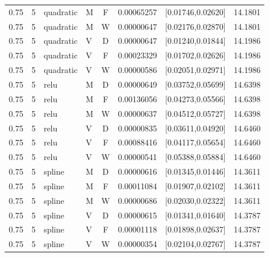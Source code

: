 \begin{longtable}{rrllcrrr}
0.75 & 5 & quadratic & M & F & 0.00065257 & [0.01746,0.02620] & 14.1801 \\

0.75 & 5 & quadratic & M & W & 0.00000647 & [0.02176,0.02870] & 14.1801 \\

0.75 & 5 & quadratic & V & D & 0.00000647 & [0.01240,0.01844] & 14.1986 \\

0.75 & 5 & quadratic & V & F & 0.00023329 & [0.01702,0.02626] & 14.1986 \\

0.75 & 5 & quadratic & V & W & 0.00000586 & [0.02051,0.02971] & 14.1986 \\

0.75 & 5 & relu & M & D & 0.00000649 & [0.03752,0.05699] & 14.6398 \\

0.75 & 5 & relu & M & F & 0.00136056 & [0.04273,0.05566] & 14.6398 \\

0.75 & 5 & relu & M & W & 0.00000637 & [0.04512,0.05727] & 14.6398 \\

0.75 & 5 & relu & V & D & 0.00000835 & [0.03611,0.04920] & 14.6460 \\

0.75 & 5 & relu & V & F & 0.00088416 & [0.04117,0.05654] & 14.6460 \\

0.75 & 5 & relu & V & W & 0.00000541 & [0.05388,0.05884] & 14.6460 \\

0.75 & 5 & spline & M & D & 0.00000616 & [0.01345,0.01446] & 14.3611 \\

0.75 & 5 & spline & M & F & 0.00011084 & [0.01907,0.02102] & 14.3611 \\

0.75 & 5 & spline & M & W & 0.00000686 & [0.02030,0.02322] & 14.3611 \\

0.75 & 5 & spline & V & D & 0.00000615 & [0.01341,0.01640] & 14.3787 \\

0.75 & 5 & spline & V & F & 0.00001118 & [0.01898,0.02637] & 14.3787 \\

0.75 & 5 & spline & V & W & 0.00000354 & [0.02104,0.02767] & 14.3787 \\


\end{longtable}
